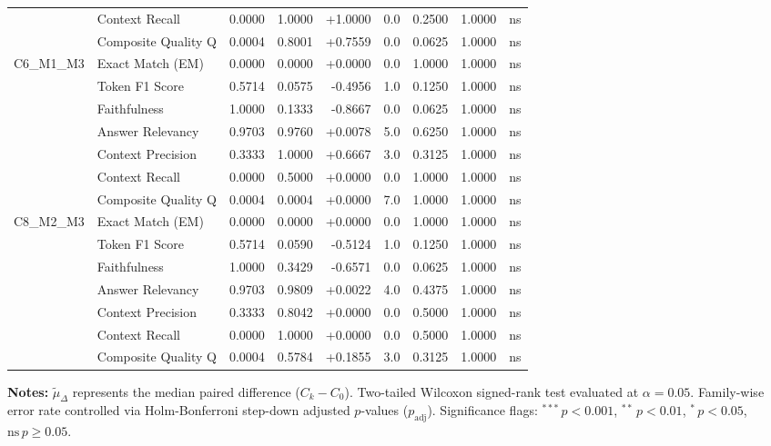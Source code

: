 \begin{table}[p]
\begin{tabular*}{\textwidth}{@{\extracolsep{\fill}} l l r r r r r r c @{}}
                & Context Recall       & 0.0000 & 1.0000 & +1.0000 & 0.0 & 0.2500 & 1.0000 & ns \\
                & Composite Quality Q  & 0.0004 & 0.8001 & +0.7559 & 0.0 & 0.0625 & 1.0000 & ns \\
\addlinespace
C6\_M1\_M3      & Exact Match (EM)     & 0.0000 & 0.0000 & +0.0000 & 0.0 & 1.0000 & 1.0000 & ns \\
                & Token F1 Score       & 0.5714 & 0.0575 & -0.4956 & 1.0 & 0.1250 & 1.0000 & ns \\
                & Faithfulness         & 1.0000 & 0.1333 & -0.8667 & 0.0 & 0.0625 & 1.0000 & ns \\
                & Answer Relevancy     & 0.9703 & 0.9760 & +0.0078 & 5.0 & 0.6250 & 1.0000 & ns \\
                & Context Precision    & 0.3333 & 1.0000 & +0.6667 & 3.0 & 0.3125 & 1.0000 & ns \\
                & Context Recall       & 0.0000 & 0.5000 & +0.0000 & 0.0 & 1.0000 & 1.0000 & ns \\
                & Composite Quality Q  & 0.0004 & 0.0004 & +0.0000 & 7.0 & 1.0000 & 1.0000 & ns \\
\addlinespace
C8\_M2\_M3      & Exact Match (EM)     & 0.0000 & 0.0000 & +0.0000 & 0.0 & 1.0000 & 1.0000 & ns \\
                & Token F1 Score       & 0.5714 & 0.0590 & -0.5124 & 1.0 & 0.1250 & 1.0000 & ns \\
                & Faithfulness         & 1.0000 & 0.3429 & -0.6571 & 0.0 & 0.0625 & 1.0000 & ns \\
                & Answer Relevancy     & 0.9703 & 0.9809 & +0.0022 & 4.0 & 0.4375 & 1.0000 & ns \\
                & Context Precision    & 0.3333 & 0.8042 & +0.0000 & 0.0 & 0.5000 & 1.0000 & ns \\
                & Context Recall       & 0.0000 & 1.0000 & +0.0000 & 0.0 & 0.5000 & 1.0000 & ns \\
                & Composite Quality Q  & 0.0004 & 0.5784 & +0.1855 & 3.0 & 0.3125 & 1.0000 & ns \\
\bottomrule
\end{tabular*}
\vspace{0.5em}
\parbox{\textwidth}{\footnotesize
\textbf{Notes:} $\tilde{\mu}_\Delta$ represents the median paired difference ($C_k - C_0$). Two-tailed Wilcoxon signed-rank test evaluated at $\alpha = 0.05$. Family-wise error rate controlled via Holm-Bonferroni step-down adjusted $p$-values ($p_{\text{adj}}$). Significance flags: $^{***}\,p < 0.001$, $^{**}\,p < 0.01$, $^{*}\,p < 0.05$, $\text{ns}\,p \ge 0.05$.}
\end{table}
